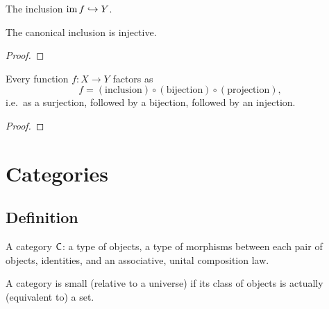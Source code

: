 \begin{definition}
  \label{def:prelims:canonical-inclusion}
  \leanok
  The inclusion $\operatorname{im} f \hookrightarrow Y$.
\end{definition}

\begin{proposition}
  \label{prop:prelims:canonical-inclusion-injective}
  \leanok
  The canonical inclusion is injective.
\end{proposition}
\begin{proof}
  \leanok
\end{proof}

\begin{theorem}
  \label{thm:prelims:canonical-decomposition}
  \leanok
  Every function $f : X \to Y$ factors as
  \[
    f = (\text{inclusion}) \circ (\text{bijection}) \circ (\text{projection}),
  \]
  i.e.\ as a surjection, followed by a bijection, followed by an
  injection.
\end{theorem}
\begin{proof}
  \leanok
\end{proof}

\section{Categories}
\label{sec:prelims:categories}

\subsection{Definition}
\label{subsec:prelims:categories:definition}

\begin{definition}[Category]
  \label{def:prelims:category}
  \leanok
  A category $\mathsf{C}$: a type of objects, a type of morphisms
  between each pair of objects, identities, and an associative,
  unital composition law.
\end{definition}

\begin{definition}
  \label{def:prelims:category-is-small}
  \leanok
  A category is small (relative to a universe) if its class of
  objects is actually (equivalent to) a set.
\end{definition}

